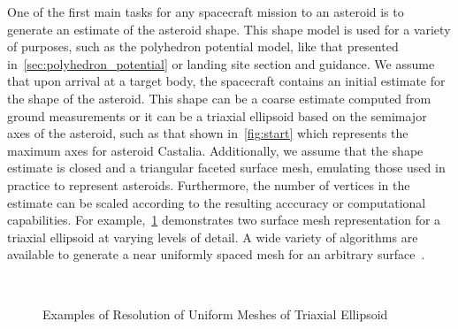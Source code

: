 One of the first main tasks for any spacecraft mission to an asteroid is to generate an estimate of the asteroid shape.
This shape model is used for a variety of purposes, such as the polyhedron potential model, like that presented in~\cref{sec:polyhedron_potential} or landing site section and guidance.
We assume that upon arrival at a target body, the spacecraft contains an initial estimate for the shape of the asteroid.
This shape can be a coarse estimate computed from ground measurements or it can be a triaxial ellipsoid based on the semimajor axes of the asteroid, such as that shown in~\cref{fig:start} which represents the maximum axes for asteroid Castalia.
Additionally, we assume that the shape estimate is closed and a triangular faceted surface mesh, emulating those used in practice to represent asteroids.
Furthermore, the number of vertices in the estimate can be scaled according to the resulting acccuracy or computational capabilities.
For example,~\cref{fig:uniform_mesh} demonstrates two surface mesh representation for a triaxial ellipsoid at varying levels of detail. 
A wide variety of algorithms are available to generate a near uniformly spaced mesh for an arbitrary surface~\cite{persson2004,boissonnat2005}.
\begin{figure}[htbp]
    \centering
    ~
    \caption{Examples of Resolution of Uniform Meshes of Triaxial Ellipsoid~\label{fig:uniform_mesh}}
\end{figure}

